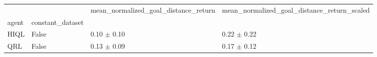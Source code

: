 \begin{tabular}{llll}
\toprule
 &  & mean_normalized_goal_distance_return & mean_normalized_goal_distance_return_scaled \\
agent & constant_dataset &  &  \\
\midrule
HIQL & False & 0.10 $\pm$ 0.10 & 0.22 $\pm$ 0.22 \\
\cline{1-4}
QRL & False & 0.13 $\pm$ 0.09 & 0.17 $\pm$ 0.12 \\
\cline{1-4}
\bottomrule
\end{tabular}
